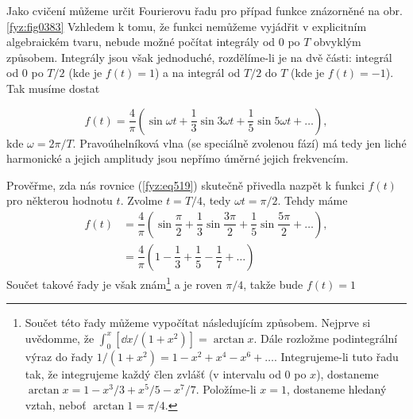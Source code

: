   Jako cvičení můžeme určit Fourierovu řadu pro případ funkce znázorněné na obr. \ref{fyz:fig0383} 
  Vzhledem k tomu, že funkci nemůžeme vyjádřit v explicitním algebraickém tvaru, nebude možné 
  počítat integrály od \num{0} po \(T\) obvyklým způsobem. Integrály jsou však jednoduché, 
  rozdělíme-li je na dvě části: integrál od \num{0} po \(T/2\) (kde je \(f(t) = 1\)) a na integrál 
  od \(T/2\) do \(T\) (kde je \(f(t) = - 1\)). Tak musíme dostat
  
  \begin{equation}\label{fyz:eq519}
    f(t) = \dfrac{4}{\pi}
             \left(
                \sin\omega t + \dfrac{1}{3}\sin3\omega t + \dfrac{1}{5}\sin5\omega t + \ldots
             \right),
  \end{equation}
  kde \(\omega = 2\pi/T\). Pravoúhelníková vlna (se speciálně zvolenou fází) má tedy jen liché 
  harmonické a jejich amplitudy jsou nepřímo úměrné jejich frekvencím. 
  
  Prověřme, zda nás rovnice (\ref{fyz:eq519}) skutečně přivedla nazpět k funkci \(f(t)\) pro 
  některou hodnotu \(t\). Zvolme \(t = T/4\), tedy \(\omega t = \pi/2\). Tehdy máme
  \begin{align}\label{fyz:eq520}
    f(t) &= \dfrac{4}{\pi}
              \left(
                \sin\dfrac{\pi}{2} + \dfrac{1}{3}\sin\dfrac{3\pi}{2} + 
                \dfrac{1}{5}\sin\dfrac{5\pi}{2} + \ldots
              \right),                \nonumber \\
         &= \dfrac{4}{\pi}
              \left(
                1 - \dfrac{1}{3} + \dfrac{1}{5} - \dfrac{1}{7} + \ldots
              \right)
  \end{align}
  Součet takové řady je však znám\footnote{Součet této řady můžeme vypočítat následujícím způsobem. 
  Nejprve si uvědomme, že \(\int_0^x[\dd{x}/(1+x^2)]=\arctan x\). Dále rozložme podintegrální výraz 
  do 
  řady \(1/(1+x^2) = 1 - x^2 + x^4 - x^6 + \ldots\). Integrujeme-li tuto řadu tak, že integrujeme 
  každý člen zvlášť (v intervalu od \num{0} po \(x\)), dostaneme \(\arctan x = 1 - x^3/3 + x^5/5 - 
  x^7/7\). Položíme-li \(x = 1\), dostaneme hledaný vztah, neboť \(\arctan 1 = \pi/4\).} a je roven 
  \(\pi/4\), takže bude \(f(t) = 1\)
  
